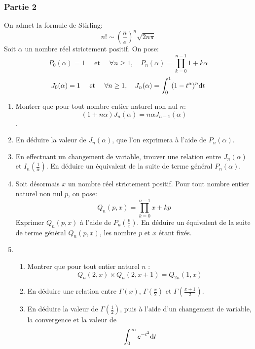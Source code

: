 \documentclass{article}
\def \de {{\rm d}}
\begin{document}
\subsubsection*{Partie 2}
On admet la formule de Stirling:
\[n!\sim \left(\frac ne\right)^n\sqrt{2n\pi}\]
Soit $\alpha$ un nombre réel strictement positif. On pose:
\[P_0(\alpha)=1\quad\mbox{ et }\quad \forall n\geq 1,\quad P_n(\alpha)=\prod_{k=0}^{n-1}1+k\alpha\]
\[J_0(\alpha)=1\quad\mbox{ et }\quad \forall n\geq 1,\quad J_n(\alpha)=\int_{0}^{1}(1-t^\alpha)^n\de t\]
\begin{enumerate}
\item Montrer que pour tout nombre entier naturel non nul $n$: 
\[(1+n\alpha)J_n(\alpha)= n\alpha J_{n-1}(\alpha)\].
\item En déduire la valeur de $J_n(\alpha)$, que l'on exprimera à l'aide de $P_n(\alpha)$.
\item En effectuant un changement de variable, trouver une relation entre $J_n(\alpha)$ et $I_n(\frac 1{\alpha})$. En déduire un équivalent de la suite de terme général $P_n(\alpha)$.
\item Soit désormais $x$ un nombre réel strictement positif. Pour tout nombre entier naturel non nul $p$, on pose:
\[Q_n(p,x)=\prod_{k=0}^{n-1}x+kp\]
Exprimer $Q_n(p,x)$ à l'aide de $P_n(\frac px)$. En déduire un équivalent de la suite de terme général $Q_n(p,x)$, les nombre $p$ et $x$ étant fixés.
\item \begin{enumerate}
\item Montrer que pour tout entier naturel $n$ : 
\[Q_n(2,x)\times  Q_n(2,x+1) =Q_{2n}(1,x)\]
\item En déduire une relation entre $\Gamma(x)$, $\Gamma(\frac x2)$ et $\Gamma(\frac {x+1}2)$.
\item En déduire la valeur de $\Gamma(\frac 12)$, puis à l'aide d'un changement de variable, la convergence et la valeur de 
\[\int_0^\infty e^{-t^2}\de t\]
\end{enumerate}
\end{enumerate}
  
\end{document}
